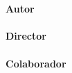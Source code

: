 {\vfill

\begin{large}
\begin{center}
\textoPrimerSubtituloPortadaVal
\mbox{ } \\ \mbox{ } \\ 
{\Large \bfseries Autor}\\
\textbf{\autorPortadaVal}\\[1.0cm]
{\Large \bfseries Director}\\
\textbf{\directorPortadaVal}\\[0.3cm]
{\Large \bfseries Colaborador}\\
\textbf{\colaboradorPortadaVal}\\[0.3cm]
\mbox{ } \\ \mbox{ } \\ 
\textoSegundoSubtituloPortadaVal \\ [0.3em]
\end{center}
\end{large}

\vfill

\begin{large}
\begin{center}
\textbf{\institucionVal}\\[0.2em]
    \mbox{ }  \\
\textbf{\fechaPublicacionVal}
\end{center}
\end{large}


\newpage
\thispagestyle{empty}
%

} %

